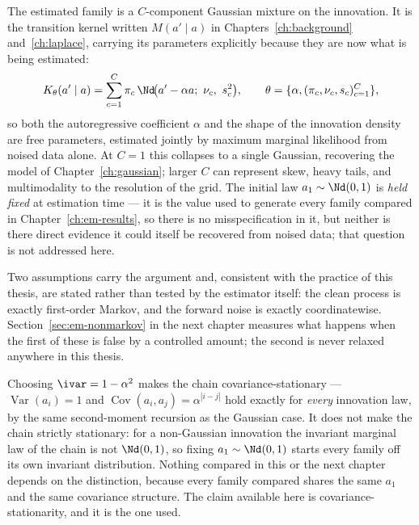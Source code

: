 The estimated family is a $C$-component Gaussian mixture on the innovation.
It is the transition kernel written $M(a' \mid a)$ in
Chapters~\ref{ch:background} and~\ref{ch:laplace}, carrying its parameters
explicitly because they are now what is being estimated:
\begin{equation}
  K_\theta(a' \mid a) = \sum_{c=1}^{C} \pi_c \,
    \Nd\!\big(a' - \alpha a;\ \nu_c,\ s_c^2\big),
  \qquad \theta = \{\alpha, (\pi_c,\nu_c,s_c)_{c=1}^C\},
  \label{eq:em-mixture-kernel}
\end{equation}
so both the autoregressive coefficient $\alpha$ and the shape of the
innovation density are free parameters, estimated jointly by maximum marginal
likelihood from noised data alone. At $C=1$ this collapses to a single
Gaussian, recovering the model of Chapter~\ref{ch:gaussian}; larger $C$ can
represent skew, heavy tails, and multimodality to the resolution of the
grid. The initial law $a_1 \sim \Nd(0,1)$ is \emph{held fixed} at
estimation time --- it is the value used to generate every family compared in
Chapter~\ref{ch:em-results}, so there is no misspecification in it, but
neither is there direct evidence it could itself be recovered from noised
data; that question is not addressed here.

Two assumptions carry the argument and, consistent with the practice of this
thesis, are stated rather than tested by the estimator itself: the clean
process is exactly first-order Markov, and the forward noise is exactly
coordinatewise. Section~\ref{sec:em-nonmarkov} in the next chapter measures
what happens when the first of these is false by a controlled amount; the
second is never relaxed anywhere in this thesis.

\begin{remark}
Choosing $\ivar=1-\alpha^2$ makes the chain covariance-stationary --- $\operatorname{Var}(a_i)=1$
and $\operatorname{Cov}(a_i,a_j)=\alpha^{|i-j|}$ hold exactly for \emph{every} innovation
law, by the same second-moment recursion as the Gaussian case. It does not
make the chain strictly stationary: for a non-Gaussian innovation the
invariant marginal law of the chain is not $\Nd(0,1)$, so fixing $a_1\sim
\Nd(0,1)$ starts every family off its own invariant distribution. Nothing
compared in this or the next chapter depends on the distinction, because every
family compared shares the same $a_1$ and the same covariance structure. The
claim available here is covariance-stationarity, and it is the one used.
\end{remark}

